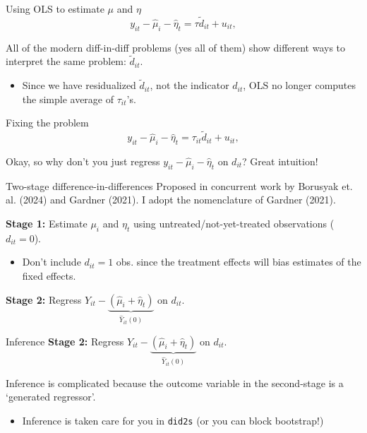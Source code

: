 \documentclass[t]{beamer}
\begin{document}
\begin{frame}{Using OLS to estimate $\mu$ and $\eta$}
  $$
    y_{it} - \hat{\mu}_i - \hat{\eta}_t = \tau \tilde{d}_{it} + u_{it},
  $$

  \bigskip
  All of the modern diff-in-diff problems (yes all of them) show different ways to interpret the same problem: $\tilde{d}_{it}$.
  \begin{itemize}
    \item Since we have residualized $\tilde{d}_{it}$, not the indicator $d_{it}$, OLS no longer computes the simple average of $\tau_{it}$'s.
  \end{itemize}
\end{frame}

\begin{frame}{Fixing the problem}
  $$
  y_{it} - \hat{\mu}_i - \hat{\eta}_t = \tau_{it} \tilde{d}_{it} + u_{it},
  $$

  \bigskip
  Okay, so why don't you just regress $y_{it} - \hat{\mu}_i - \hat{\eta}_t$ on $d_{it}$? \pause Great intuition!
\end{frame}

\begin{frame}{Two-stage difference-in-differences}
  Proposed in concurrent work by Borusyak et. al. (2024) and Gardner (2021). I adopt the nomenclature of Gardner (2021).

  \bigskip
  \textbf{Stage 1:}
  Estimate $\mu_i$ and $\eta_t$ using untreated/not-yet-treated observations ($d_{it} = 0$).
  \begin{itemize}
    \item Don't include $d_{it} = 1$ obs. since the treatment effects will bias estimates of the fixed effects.
  \end{itemize}

  \pause
  \bigskip
  \textbf{Stage 2:}
  Regress $Y_{it} - \underbrace{\left( \hat{\mu}_i + \hat{\eta}_t \right)}_{\hat{Y}_{it}(0)}$ on $d_{it}$.
\end{frame}

\begin{frame}{Inference}
  \textbf{Stage 2:}
  Regress $Y_{it} - \underbrace{\left( \hat{\mu}_i + \hat{\eta}_t \right)}_{\hat{Y}_{it}(0)}$ on $d_{it}$.

  \bigskip
  Inference is complicated because the outcome variable in the second-stage is a `generated regressor'.
  \begin{itemize}
    \item Inference is taken care for you in \texttt{did2s} (or you can block bootstrap!)
  \end{itemize}
\end{frame}
\end{document}
